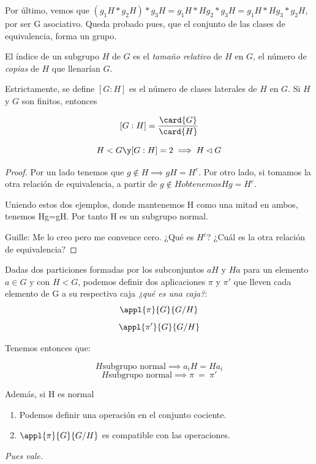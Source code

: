 \documentclass{apuntes}
\begin{document}
  Por último, vemos que $(g_{1}H\ast g_{2}H)\ast g_{3}H=g_{1}H\ast Hg_{2}\ast g_{3}H=g_{1}H\ast Hg_{3}\ast g_{2}H$, por ser G asociativo. Queda probado pues, que el conjunto de las clases de equivalencia, forma un grupo.
  
\begin{defn} El índice de un subgrupo $H$ de $G$ es el \textit{tamaño relativo} de $H$ en $G$, el número de \textit{copias} de $H$ que llenarían $G$.  

Estrictamente, se define $[G:H]$ es el número de clases laterales de $H$ en $G$. Si $H$ y $G$ son finitos, entonces 

\[ [G:H] = \frac{\card{G}}{\card{H}} \]
\end{defn}
  
  \begin{theorem}
   \[ H< G \y [G:H]=2 \implies H \lhd G \]
  \end{theorem}
  
  \begin{proof}
   Por un lado tenemos que $g\notin H \implies gH= H^{c}$. Por otro lado, si tomamos la otra relación de equivalencia, a partir de $g \notin H obtenemos Hg=H^{c}$.
   
   Uniendo estos dos ejemplos, donde mantenemos H como una mitad en ambos, tenemos Hg=gH. Por tanto H es un subgrupo normal.
   
   Guille: Me lo creo pero me convence cero. ¿Qué es $H^c$? ¿Cuál es la otra relación de equivalencia?
  \end{proof}
  
  \begin{lemma}
   Dadas dos particiones formadas por los subconjuntos $aH$ y $Ha$ para un elemento $a \in G$ y con $H <G$, podemos definir dos aplicaciones $\pi$ y $\pi '$ que lleven cada elemento de G a su respectiva caja \textit{¿qué es una caja?}:
   \[ \appl{\pi}{G}{G/H} \]
   \[ \appl{\pi'}{G}{G/H} \]
   
   Tenemos entonces que:
   
   \[ H \text{subgrupo normal} \implies a_iH = Ha_i \]
   \[ H \text{subgrupo normal} \implies \pi \ =\ \pi ' \]
   
   Además, si H es normal
   \begin{enumerate}
	\item Podemos definir una operación en el conjunto cociente.     
	\item $\appl{\pi}{G}{G/H}$ es compatible con las operaciones.
   \end{enumerate}
  \textit{Pues vale.}
  \end{lemma}
  
\end{document}

